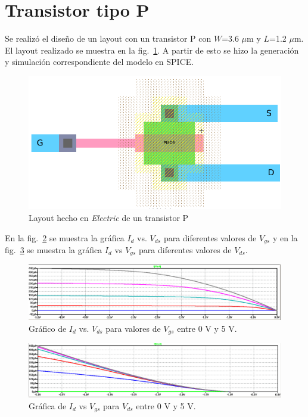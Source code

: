 \documentclass[twocolumn]{IEEEtran}
\begin{document}
\normalsize

\section{Transistor tipo P}
\noindent
Se realizó el diseño de un layout con un transistor P con $W$=3.6 $\mu$m y $L$=1.2 $\mu$m. El layout realizado se muestra en la fig.~\ref{layoutP}. A partir de esto se hizo la generación y simulación correspondiente del modelo en SPICE.

\begin{figure}[H]
  \centering
    \includegraphics[scale=0.3]{pics/layoutP.png}
      \caption{Layout hecho en \textit{Electric} de un transistor P}
	\label{layoutP}
\end{figure}
\noindent
En la fig.~\ref{simP1} se muestra la gráfica $I_d$ vs. $V_{ds}$ para diferentes valores de $V_{gs}$ y en la fig.~\ref{simP2} se muestra la gráfica $I_d$ vs $V_{gs}$ para diferentes valores de $V_{ds}$. 

\begin{figure}[H]
  \centering
    \includegraphics[scale=0.18]{pics/P_id_vds.png}
      \caption{Gráfico de $I_d$ vs. $V_{ds}$ para valores de $V_{gs}$ entre 0 V y 5 V.}
	\label{simP1}
\end{figure}

\begin{figure}[H]
  \centering
    \includegraphics[scale=0.18]{pics/P_id_vgs.png}
      \caption{Gráfica de $I_d$ vs $V_{gs}$ para $V_{ds}$ entre 0 V y 5 V.}
	\label{simP2}
\end{figure}
\end{document}
